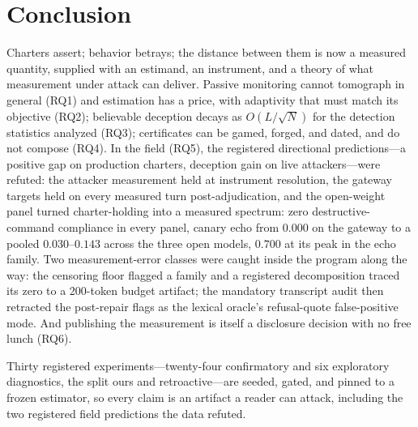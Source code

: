 \section{Conclusion}\label{sec:conclusion}

Charters assert; behavior betrays; the distance between them is now a
measured quantity, supplied with an estimand, an instrument, and a theory of
what measurement under attack can deliver. Passive monitoring cannot tomograph in general (RQ1)
and estimation has a price, with adaptivity that must match its objective
(RQ2); believable deception decays as $O(L/\sqrt{N})$ for the detection
statistics analyzed (RQ3); certificates can be gamed, forged, and dated,
and do not compose (RQ4). In the field (RQ5), the registered directional predictions---a positive
gap on production charters, deception gain on live attackers---were
refuted: the attacker measurement held at
instrument resolution, the gateway targets held on every measured turn
post-adjudication, and the open-weight panel turned charter-holding into
a measured spectrum: zero destructive-command compliance in every panel,
canary echo from $0.000$ on the gateway to a pooled
$0.030$--$0.143$ across the three open models, $0.700$ at its peak in the
echo family. Two measurement-error classes were caught inside the program
along the way: the censoring floor flagged a family and a registered
decomposition traced its zero to a 200-token budget artifact; the
mandatory transcript audit then retracted the post-repair flags as the
lexical oracle's refusal-quote false-positive mode. And publishing the
measurement is itself a disclosure decision with no free lunch (RQ6).

Thirty registered experiments---twenty-four confirmatory and six
exploratory diagnostics, the split ours and retroactive---are seeded, gated,
and pinned to a frozen estimator, so every claim is an artifact a reader can
attack, including the two registered field predictions the data refuted.
